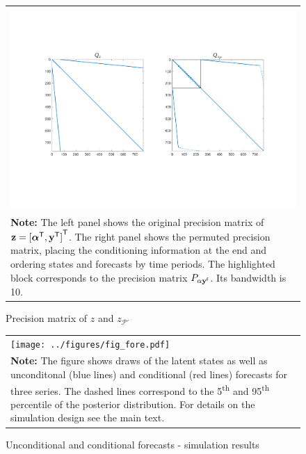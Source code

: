 \documentclass[notitlepage,a4paper,12pt]{article}
\newcommand{\transpose}[1]{{#1}^{\sf{T}}}
\begin{document}
\begin{figure}[htbp] \centering
    \caption{Precision matrix of $z$ and $z_{\mathcal{P}'}$\label{fig_Pperm}}
    \footnotesize
    \begin{tabular}{p{16cm}}
    \includegraphics*[scale=0.5,clip,trim=10 60 10 60]{../figures/fig_P_perm.pdf} \\
    \footnotesize \textbf{Note:} The left panel shows the original precision matrix of $\mathbf{z} = \transpose{[\transpose{\boldsymbol{\alpha}}, \transpose{\mathbf{y}}]}$. The right panel shows the permuted precision matrix, placing the conditioning information at the end and ordering states and forecasts by time periods. The highlighted block corresponds to the precision matrix $P_{\alpha\mathbf{y}^{\sf{f}}}$. Its bandwidth is 10.
    \end{tabular}
    \newline
    \normalsize
\end{figure}

\begin{figure}[htbp] \centering
    \caption{Unconditional and conditional forecasts - simulation results\label{fig_simfore}}
    \footnotesize
    \begin{tabular}{p{16cm}}
    \texttt{[image: ../figures/fig\_fore.pdf]} \\
    \footnotesize \textbf{Note:} The figure shows draws of the latent states as well as unconditonal (blue lines) and conditional (red lines) forecasts for three series. The dashed lines correspond to the 5\textsuperscript{th} and 95\textsuperscript{th} percentile of the posterior distribution. For details on the simulation design see the main text.
    \end{tabular}
    \newline
    \normalsize
\end{figure}
\end{document}
